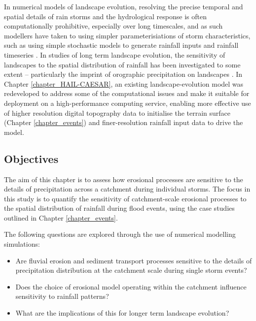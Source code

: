 In numerical models of landscape evolution, resolving the precise temporal and spatial details of rain storms and the hydrological response is often computationally prohibitive, especially over long timescales, and as such modellers have taken to using simpler parameterisiations of storm characteristics, such as using simple stochastic models to generate rainfall inputs and rainfall timeseries \citep{Eagleson1978,Tucker2001}. In studies of long term landscape evolution, the sensitivity of landscapes to the spatial distribution of rainfall has been investigated to some extent -- particularly the imprint of orographic precipitation on landscapes \citep[e.g][]{Roe2002,Anders2008,han2015measuring}. In Chapter \ref{chapter_HAIL-CAESAR}, an existing landscape-evolution model was redeveloped to address some of the computational issues and make it suitable for deployment on a high-performance computing service, enabling more effective use of higher resolution digital topography data to initialise the terrain surface (Chapter \ref{chapter_events}) and finer-resolution rainfall input data to drive the model. 

\subsection{Objectives}
The aim of this chapter is to assess how erosional processes are sensitive to the details of precipitation across a catchment during individual storms. The focus in this study is to quantify the sensitivity of catchment-scale erosional processes to the spatial distribution of rainfall during flood events, using the case studies outlined in Chapter \ref{chapter_events}.

The following questions are explored through the use of numerical modelling simulations:

\begin{itemize}
\item Are fluvial erosion and sediment transport processes sensitive to the details of precipitation distribution at the catchment scale during single storm events?
\item Does the choice of erosional model operating within the catchment influence sensitivity to rainfall patterns? 
\item What are the implications of this for longer term landscape evolution? 
\end{itemize}

